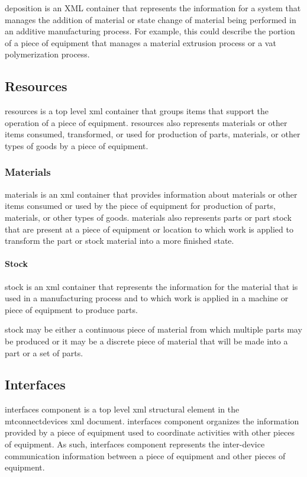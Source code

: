 \gls{deposition} is an XML container that represents the information for a system that manages the addition of material or state change of material being performed in an additive manufacturing process.  For example, this could describe the portion of a piece of equipment that manages a material extrusion process or a vat polymerization process.


\subsection{Resources}

\gls{resources} is a \gls{top level} \gls{xml} container that groups items that support the operation of a piece of equipment.   \gls{resources} also represents materials or other items consumed, transformed, or used for production of parts, materials, or other types of goods by a piece of equipment.

\subsubsection{Materials}

\gls{materials} is an \gls{xml} container that provides information about materials or other items consumed or used by the piece of equipment for production of parts, materials, or other types of goods.  \gls{materials} also represents parts or part stock that are present at a piece of equipment or location to which work is applied to transform the part or stock material into a more finished state. 

\paragraph{Stock}\mbox{}

\gls{stock} is an \gls{xml} container that represents the information for the material that is used in a manufacturing process and to which work is applied in a machine or piece of equipment to produce parts.

\gls{stock} may be either a continuous piece of material from which multiple parts may be produced or it may be a discrete piece of material that will be made into a part or a set of parts.

\subsection{Interfaces}

\gls{interfaces component} is a \gls{top level} \gls{xml} \gls{structural element} in the \gls{mtconnectdevices} \gls{xml} document.  \gls{interfaces component} organizes the information provided by a piece of equipment used to coordinate activities with other pieces of equipment.   As such, \gls{interfaces component} represents the inter-device communication information between a piece of equipment and other pieces of equipment.

